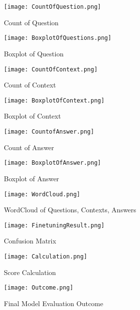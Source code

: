 \documentclass[conference]{IEEEtran}
\begin{document}
\begin{figure}[h]
\centerline{\texttt{[image: CountOfQuestion.png]}}
\caption{Count of Question}
\label{fig}
\end{figure}

\begin{figure}[h]
\centerline{\texttt{[image: BoxplotOfQuestions.png]}}
\caption{Boxplot of Question}
\label{fig}
\end{figure}

\begin{figure}[h]
\centerline{\texttt{[image: CountOfContext.png]}}
\caption{Count of Context}
\label{fig}
\end{figure}

\clearpage
\begin{figure}[h]
\centerline{\texttt{[image: BoxplotOfContext.png]}}
\caption{Boxplot of Context}
\label{fig}
\end{figure}

\begin{figure}[h]
\centerline{\texttt{[image: CountofAnswer.png]}}
\caption{Count of Answer}
\label{fig}
\end{figure}

\begin{figure}[h]
\centerline{\texttt{[image: BoxplotOfAnswer.png]}}
\caption{Boxplot of Answer}
\label{fig}
\end{figure}

\begin{figure}[h]
\centerline{\texttt{[image: WordCloud.png]}}
\caption{WordCloud of Questions, Contexts, Answers}
\label{fig}
\end{figure}

\begin{figure}[h]
\centerline{\texttt{[image: FinetuningResult.png]}}
\caption{Confusion Matrix}
\label{fig}
\end{figure}

\begin{figure}[h]
\centerline{\texttt{[image: Calculation.png]}}
\caption{Score Calculation}
\label{fig}
\end{figure}

\begin{figure}[h]
\centerline{\texttt{[image: Outcome.png]}}
\caption{Final Model Evaluation Outcome}
\label{fig}
\end{figure}
\end{document}
